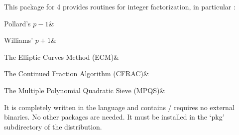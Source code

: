 
This package for {\GAP} 4 provides routines for 
integer factorization, in particular :

\beginitems
Pollard's $p-1$&

Williams' $p+1$&

The Elliptic Curves Method (ECM)&

The Continued Fraction Algorithm (CFRAC)&

The Multiple Polynomial Quadratic Sieve (MPQS)&
\enditems

It is completely written in the {\GAP} language and contains /
requires no external binaries. No other packages are needed.
It must be installed in the `pkg' subdirectory of the
{\GAP} distribution.

